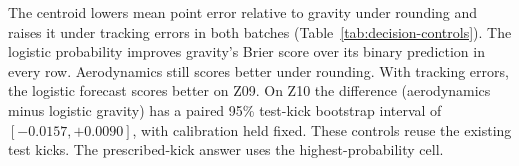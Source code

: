 The centroid lowers mean point error relative to gravity under rounding and raises it under tracking errors in both batches (Table~\ref{tab:decision-controls}). The logistic probability improves gravity's Brier score over its binary prediction in every row. Aerodynamics still scores better under rounding. With tracking errors, the logistic forecast scores better on Z09. On Z10 the difference (aerodynamics minus logistic gravity) has a paired 95\% test-kick bootstrap interval of \([-0.0157,+0.0090]\), with calibration held fixed. These controls reuse the existing test kicks. The prescribed-kick answer uses the highest-probability cell.


